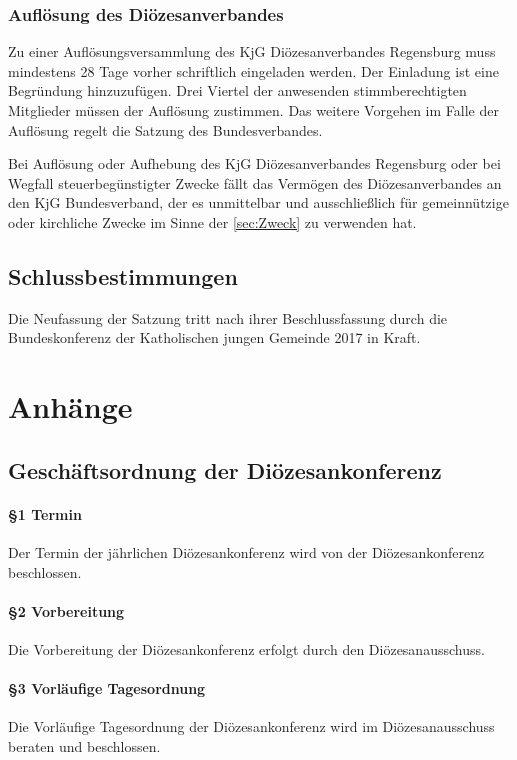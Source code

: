 \documentclass[12pt]{report}
\begin{document}
\begin{flushleft}
\section{Auflösung des Diözesanverbandes}
Zu einer Auflösungsversammlung des KjG Diözesanverbandes Regensburg muss mindestens 28 Tage vorher
schriftlich eingeladen werden. Der Einladung ist eine Begründung hinzuzufügen. Drei Viertel der
anwesenden stimmberechtigten Mitglieder müssen der Auflösung zustimmen. Das weitere Vorgehen
im Falle der Auflösung regelt die Satzung des Bundesverbandes.

Bei Auflösung oder Aufhebung des KjG Diözesanverbandes Regensburg oder bei Wegfall steuerbegünstigter
Zwecke fällt das Vermögen des Diözesanverbandes an den KjG Bundesverband, der es unmittelbar und
ausschließlich für gemeinnützige oder kirchliche Zwecke im Sinne der \ref{sec:Zweck} zu verwenden hat.
\chapter{Schlussbestimmungen}
Die Neufassung der Satzung tritt nach ihrer Beschlussfassung durch die Bundeskonferenz der
Katholischen jungen Gemeinde 2017 in Kraft.




\part*{Anhänge}

\chapter*{Geschäftsordnung der Diözesankonferenz}

\subsection*{§1 Termin}
Der Termin der jährlichen Diözesankonferenz wird von der Diözesankonferenz beschlossen.
\subsection*{§2 Vorbereitung}
Die Vorbereitung der Diözesankonferenz erfolgt durch den Diözesanausschuss.
\subsection*{§3 Vorläufige Tagesordnung}
Die Vorläufige Tagesordnung der Diözesankonferenz wird im Diözesanausschuss beraten und beschlossen.

\end{flushleft}
\end{document}

